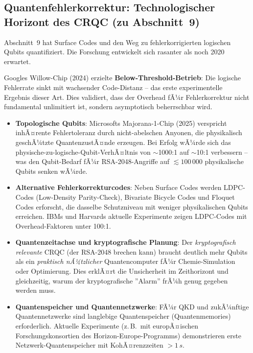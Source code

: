 ﻿\documentclass[a4paper,12pt]{article}
\theoremstyle{definition}
\begin{document}
\subsection{Quantenfehlerkorrektur: Technologischer Horizont des CRQC (zu Abschnitt~9)}

Abschnitt~9 hat Surface Codes und den Weg zu fehlerkorrigierten
logischen Qubits quantifiziert. Die Forschung entwickelt sich
rasanter als noch 2020 erwartet.

Googles Willow-Chip (2024) erzielte \textbf{Below-Threshold-Betrieb}:
Die logische Fehlerrate sinkt mit wachsender Code-Distanz -- das erste
experimentelle Ergebnis dieser Art. Dies validiert, dass der
Overhead fÃ¼r Fehlerkorrektur nicht fundamental unlimitiert ist,
sondern asymptotisch beherrschbar wird.

\begin{itemize}
  \item \textbf{Topologische Qubits}:
    Microsofts Majorana-1-Chip (2025) verspricht inhÃ¤rente
    Fehlertoleranz durch nicht-abelschen Anyonen, die physikalisch
    geschÃ¼tzte QuantenzustÃ¤nde erzeugen. Bei Erfolg wÃ¼rde sich das
    physische-zu-logische-Qubit-VerhÃ¤ltnis von $\sim$1000:1 auf
    $\sim$10:1 verbessern -- was den Qubit-Bedarf fÃ¼r RSA-2048-Angriffe
    auf $\lesssim 100\,000$ physikalische Qubits senken wÃ¼rde.
  \item \textbf{Alternative Fehlerkorrekturcodes}:
    Neben Surface Codes werden LDPC-Codes (Low-Density Parity-Check),
    Bivariate Bicycle Codes und Floquet Codes erforscht,
    die dasselbe Schutzniveau mit weniger physikalischen Qubits erreichen.
    IBMs und Harvards aktuelle Experimente zeigen LDPC-Codes mit
    Overhead-Faktoren unter 100:1.
  \item \textbf{Quantenzeitachse und kryptografische Planung}:
    Der \emph{kryptografisch relevante} CRQC (der RSA-2048 brechen kann)
    braucht deutlich mehr Qubits als ein \emph{praktisch nÃ¼tzlicher}
    Quantencomputer fÃ¼r Chemie-Simulation oder Optimierung.
    Dies erklÃ¤rt die Unsicherheit im Zeithorizont und gleichzeitig,
    warum der kryptografische ''Alarm'' frÃ¼h genug gegeben werden muss.
  \item \textbf{Quantenspeicher und Quantennetzwerke}:
    FÃ¼r QKD und zukÃ¼nftige Quantennetzwerke sind langlebige
    Quantenspeicher (Quantenmemories) erforderlich. Aktuelle
    Experimente (z.\,B.\ mit europÃ¤ischen Forschungskonsortien
    des Horizon-Europe-Programms) demonstrieren erste
    Netzwerk-Quantenspeicher mit KohÃ¤renzzeiten $> 1\,s$.
\end{itemize}
\end{document}
